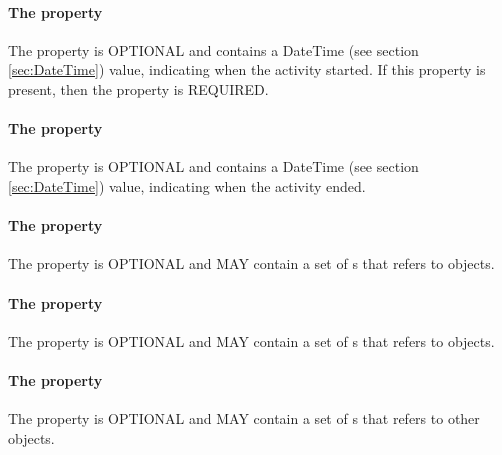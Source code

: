 {\paragraph{The  property}\label{sec:startedAtTime}
The  property is OPTIONAL and contains a DateTime (see section \ref{sec:DateTime}) value, indicating when the activity started.  If this property is present, then the  property is REQUIRED.

\paragraph{The  property}\label{sec:endedAtTime}
The  property is OPTIONAL and contains a DateTime (see section \ref{sec:DateTime}) value, indicating when the activity ended.

\paragraph{The  property}\label{sec:associations}
The  property is OPTIONAL and MAY contain a set of s that refers to  objects.

\paragraph{The  property}\label{sec:usages}
The  property is OPTIONAL and MAY contain a set of s that refers to  objects.

\paragraph{The  property}\label{sec:wasInformedBys}
The  property is OPTIONAL and MAY contain a set of s that refers to other  objects.
}



